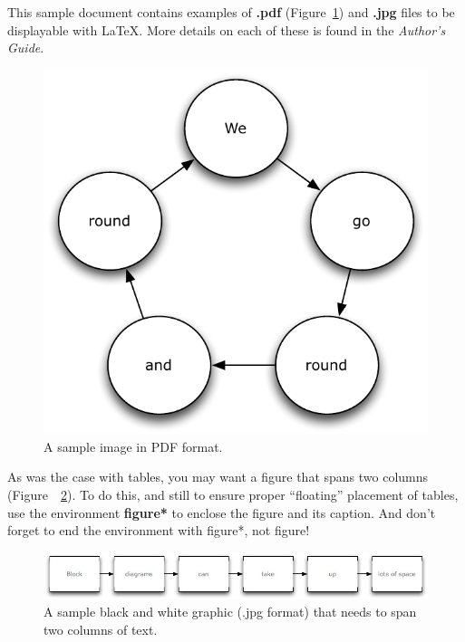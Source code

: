 \documentclass[sigconf]{nimepaper}
\begin{document}
This sample document contains examples of \textbf{.pdf} (Figure~\ref{fig:BlockDiagram1}) and \textbf{.jpg} files to be displayable with \LaTeX. More details on each of these is found in the \textit{Author's Guide}.

\begin{figure}[htbp]
	\centering
		\includegraphics[width=1\columnwidth]{BlockDiagram1}
	\caption{A sample image in PDF format.}
	\label{fig:BlockDiagram1}
\end{figure}

As was the case with tables, you may want a figure that spans two columns (Figure~~\ref{fig:BlockDiagram2}). To do this, and still to ensure proper ``floating'' placement of tables, use the environment \textbf{figure*} to enclose the figure and its caption. And don't forget to end the environment with {figure*}, not {figure}!

\begin{figure}[htbp]
	\centering
		\includegraphics[width=1\textwidth]{BlockDiagram2}
	\caption{A sample black and white graphic (.jpg format) that needs to span two columns of text.}
	\label{fig:BlockDiagram2}
\end{figure}
\end{document}
